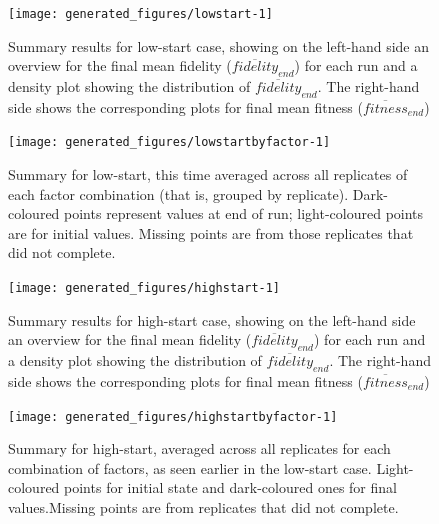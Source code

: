 \begin{knitrout}
\color{fgcolor}\begin{figure}[htp]
\texttt{[image: generated\_figures/lowstart-1]} \caption{Summary results for low-start case, showing on the left-hand side an overview for the final mean fidelity ($\overline{fidelity}_{end}$) for each run and a density plot showing the distribution of $\overline{fidelity}_{end}$. The right-hand side shows the corresponding plots for final mean fitness ($\overline{fitness}_{end}$)}\label{fig:lowstart}
\end{figure}


\end{knitrout}

\begin{knitrout}
\color{fgcolor}\begin{figure}[htp]
\texttt{[image: generated\_figures/lowstartbyfactor-1]} \caption[Summary for low-start, this time averaged across all replicates of each factor combination (that is, grouped by replicate)]{Summary for low-start, this time averaged across all replicates of each factor combination (that is, grouped by replicate). Dark-coloured points represent values at end of run; light-coloured points are for initial values. Missing points are from those replicates that did not complete.}\label{fig:lowstartbyfactor}
\end{figure}


\end{knitrout}



\begin{knitrout}
\color{fgcolor}\begin{figure}[htp]
\texttt{[image: generated\_figures/highstart-1]} \caption{Summary results for high-start case, showing on the left-hand side an overview for the final mean fidelity ($\overline{fidelity}_{end}$) for each run and a density plot showing the distribution of $\overline{fidelity}_{end}$. The right-hand side shows the corresponding plots for final mean fitness ($\overline{fitness}_{end}$)}\label{fig:highstart}
\end{figure}


\end{knitrout}

\begin{knitrout}
\color{fgcolor}\begin{figure}[htp]
\texttt{[image: generated\_figures/highstartbyfactor-1]} \caption[Summary for high-start, averaged across all replicates for each combination of factors, as seen earlier in the low-start case]{Summary for high-start, averaged across all replicates for each combination of factors, as seen earlier in the low-start case. Light-coloured points for initial state and dark-coloured ones for final values.Missing points are from replicates that did not complete.}\label{fig:highstartbyfactor}
\end{figure}


\end{knitrout}

